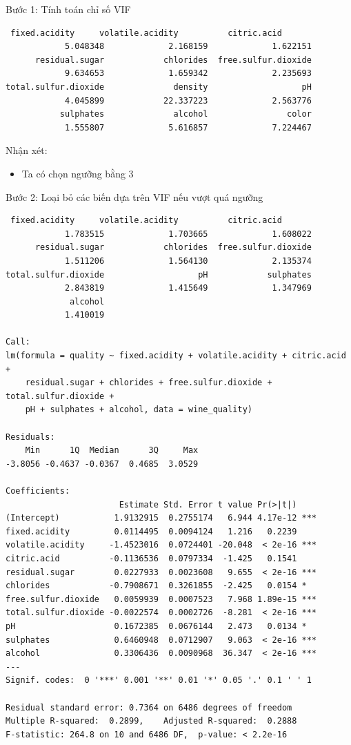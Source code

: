 Bước 1: Tính toán chỉ số VIF
\begin{lstlisting}
 fixed.acidity     volatile.acidity          citric.acid 
            5.048348             2.168159             1.622151 
      residual.sugar            chlorides  free.sulfur.dioxide 
            9.634653             1.659342             2.235693 
total.sulfur.dioxide              density                   pH 
            4.045899            22.337223             2.563776 
           sulphates              alcohol                color 
            1.555807             5.616857             7.224467 
\end{lstlisting}
Nhận xét:
\begin{itemize}
    \item Ta có chọn ngưỡng bằng 3
\end{itemize}
Bước 2: Loại bỏ các biến dựa trên VIF nếu vượt quá ngưỡng
\begin{lstlisting}
 fixed.acidity     volatile.acidity          citric.acid 
            1.783515             1.703665             1.608022 
      residual.sugar            chlorides  free.sulfur.dioxide 
            1.511206             1.564130             2.135374 
total.sulfur.dioxide                   pH            sulphates 
            2.843819             1.415649             1.347969 
             alcohol 
            1.410019 

Call:
lm(formula = quality ~ fixed.acidity + volatile.acidity + citric.acid + 
    residual.sugar + chlorides + free.sulfur.dioxide + total.sulfur.dioxide + 
    pH + sulphates + alcohol, data = wine_quality)

Residuals:
    Min      1Q  Median      3Q     Max 
-3.8056 -0.4637 -0.0367  0.4685  3.0529 

Coefficients:
                       Estimate Std. Error t value Pr(>|t|)    
(Intercept)           1.9132915  0.2755174   6.944 4.17e-12 ***
fixed.acidity         0.0114495  0.0094124   1.216   0.2239    
volatile.acidity     -1.4523016  0.0724401 -20.048  < 2e-16 ***
citric.acid          -0.1136536  0.0797334  -1.425   0.1541    
residual.sugar        0.0227933  0.0023608   9.655  < 2e-16 ***
chlorides            -0.7908671  0.3261855  -2.425   0.0154 *  
free.sulfur.dioxide   0.0059939  0.0007523   7.968 1.89e-15 ***
total.sulfur.dioxide -0.0022574  0.0002726  -8.281  < 2e-16 ***
pH                    0.1672385  0.0676144   2.473   0.0134 *  
sulphates             0.6460948  0.0712907   9.063  < 2e-16 ***
alcohol               0.3306436  0.0090968  36.347  < 2e-16 ***
---
Signif. codes:  0 '***' 0.001 '**' 0.01 '*' 0.05 '.' 0.1 ' ' 1

Residual standard error: 0.7364 on 6486 degrees of freedom
Multiple R-squared:  0.2899,	Adjusted R-squared:  0.2888 
F-statistic: 264.8 on 10 and 6486 DF,  p-value: < 2.2e-16
\end{lstlisting}

